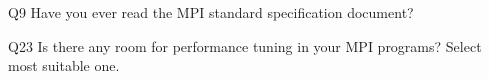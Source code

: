 \begin{description}%
\item{Q9} Have you ever read the MPI standard specification document?%
\item{Q23} Is there any room for performance tuning in your MPI programs? Select most suitable one.%
\end{description}%
